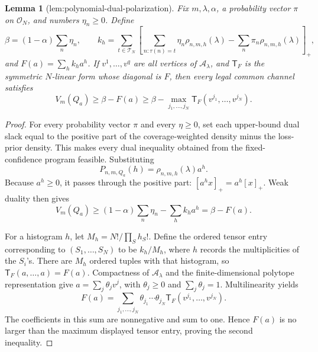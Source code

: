\documentclass{article}
\newtheorem{lemma}{Lemma}
\begin{document}
\begin{lemma}[lem:polynomial-dual-polarization]\label{lem:polynomial-dual-polarization}
Fix \(m,\lambda,\alpha\), a probability vector \(\pi\) on \(\mathcal O_N\), and numbers \(\eta_n\ge0\).  Define
\[
 \beta=(1-\alpha)\sum_n\eta_n,
 \qquad
 k_h=\sum_{t\in\mathcal T_N}\left[
 \sum_{n:\tau(n)=t}\eta_n\rho_{n,m,h}(\lambda)
 -\sum_n\pi_n\rho_{n,m,h}(\lambda)
 \right]_+,
\]
and \(F(a)=\sum_hk_ha^h\).  If \(v^1,\ldots,v^q\) are all vertices of \(\mathcal A_\lambda\), and \(\mathsf T_F\) is the symmetric \(N\)-linear form whose diagonal is \(F\), then every legal common channel satisfies
\[
 V_m(Q_a)\ge\beta-F(a)
 \ge\beta-\max_{j_1,\ldots,j_N}\mathsf T_F(v^{j_1},\ldots,v^{j_N}).
\]
\end{lemma}
\begin{proof}
For every probability vector \(\pi\) and every \(\eta\ge0\), set each upper-bound dual slack equal to the positive part of the coverage-weighted density minus the loss-prior density.  This makes every dual inequality obtained from the fixed-confidence program feasible.  Substituting
\[
 P_{n,m,Q_a}(h)=\rho_{n,m,h}(\lambda)a^h.
\]
Because \(a^h\ge0\), it passes through the positive part: \([a^hx]_+=a^h[x]_+\).  Weak duality then gives
\[
 V_m(Q_a)\ge (1-\alpha)\sum_n\eta_n-\sum_hk_ha^h
 =\beta-F(a).
\]

For a histogram \(h\), let \(M_h=N!/\prod_Sh_S!\).  Define the ordered tensor entry corresponding to \((S_1,\ldots,S_N)\) to be \(k_h/M_h\), where \(h\) records the multiplicities of the \(S_i\)'s.  There are \(M_h\) ordered tuples with that histogram, so \(\mathsf T_F(a,\ldots,a)=F(a)\).  Compactness of \(\mathcal A_\lambda\) and the finite-dimensional polytope representation give \(a=\sum_j\theta_jv^j\), with \(\theta_j\ge0\) and \(\sum_j\theta_j=1\).  Multilinearity yields
\[
 F(a)=\sum_{j_1,\ldots,j_N}
 \theta_{j_1}\cdots\theta_{j_N}
 \mathsf T_F(v^{j_1},\ldots,v^{j_N}).
\]
The coefficients in this sum are nonnegative and sum to one.  Hence \(F(a)\) is no larger than the maximum displayed tensor entry, proving the second inequality.
\end{proof}
\end{document}
